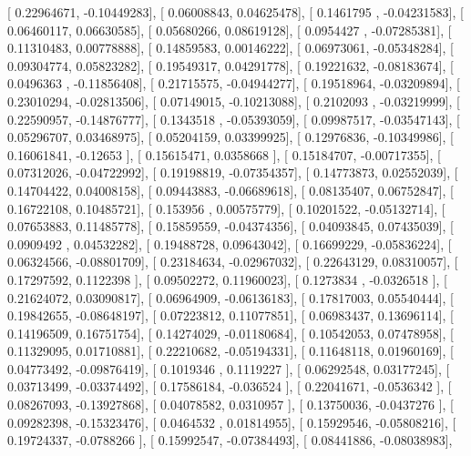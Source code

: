\documentclass{article}
\begin{document}
       [ 0.22964671, -0.10449283],
       [ 0.06008843,  0.04625478],
       [ 0.1461795 , -0.04231583],
       [ 0.06460117,  0.06630585],
       [ 0.05680266,  0.08619128],
       [ 0.0954427 , -0.07285381],
       [ 0.11310483,  0.00778888],
       [ 0.14859583,  0.00146222],
       [ 0.06973061, -0.05348284],
       [ 0.09304774,  0.05823282],
       [ 0.19549317,  0.04291778],
       [ 0.19221632, -0.08183674],
       [ 0.0496363 , -0.11856408],
       [ 0.21715575, -0.04944277],
       [ 0.19518964, -0.03209894],
       [ 0.23010294, -0.02813506],
       [ 0.07149015, -0.10213088],
       [ 0.2102093 , -0.03219999],
       [ 0.22590957, -0.14876777],
       [ 0.1343518 , -0.05393059],
       [ 0.09987517, -0.03547143],
       [ 0.05296707,  0.03468975],
       [ 0.05204159,  0.03399925],
       [ 0.12976836, -0.10349986],
       [ 0.16061841, -0.12653   ],
       [ 0.15615471,  0.0358668 ],
       [ 0.15184707, -0.00717355],
       [ 0.07312026, -0.04722992],
       [ 0.19198819, -0.07354357],
       [ 0.14773873,  0.02552039],
       [ 0.14704422,  0.04008158],
       [ 0.09443883, -0.06689618],
       [ 0.08135407,  0.06752847],
       [ 0.16722108,  0.10485721],
       [ 0.153956  ,  0.00575779],
       [ 0.10201522, -0.05132714],
       [ 0.07653883,  0.11485778],
       [ 0.15859559, -0.04374356],
       [ 0.04093845,  0.07435039],
       [ 0.0909492 ,  0.04532282],
       [ 0.19488728,  0.09643042],
       [ 0.16699229, -0.05836224],
       [ 0.06324566, -0.08801709],
       [ 0.23184634, -0.02967032],
       [ 0.22643129,  0.08310057],
       [ 0.17297592,  0.1122398 ],
       [ 0.09502272,  0.11960023],
       [ 0.1273834 , -0.0326518 ],
       [ 0.21624072,  0.03090817],
       [ 0.06964909, -0.06136183],
       [ 0.17817003,  0.05540444],
       [ 0.19842655, -0.08648197],
       [ 0.07223812,  0.11077851],
       [ 0.06983437,  0.13696114],
       [ 0.14196509,  0.16751754],
       [ 0.14274029, -0.01180684],
       [ 0.10542053,  0.07478958],
       [ 0.11329095,  0.01710881],
       [ 0.22210682, -0.05194331],
       [ 0.11648118,  0.01960169],
       [ 0.04773492, -0.09876419],
       [ 0.1019346 ,  0.1119227 ],
       [ 0.06292548,  0.03177245],
       [ 0.03713499, -0.03374492],
       [ 0.17586184, -0.036524  ],
       [ 0.22041671, -0.0536342 ],
       [ 0.08267093, -0.13927868],
       [ 0.04078582,  0.0310957 ],
       [ 0.13750036, -0.0437276 ],
       [ 0.09282398, -0.15323476],
       [ 0.0464532 ,  0.01814955],
       [ 0.15929546, -0.05808216],
       [ 0.19724337, -0.0788266 ],
       [ 0.15992547, -0.07384493],
       [ 0.08441886, -0.08038983],
\end{document}
